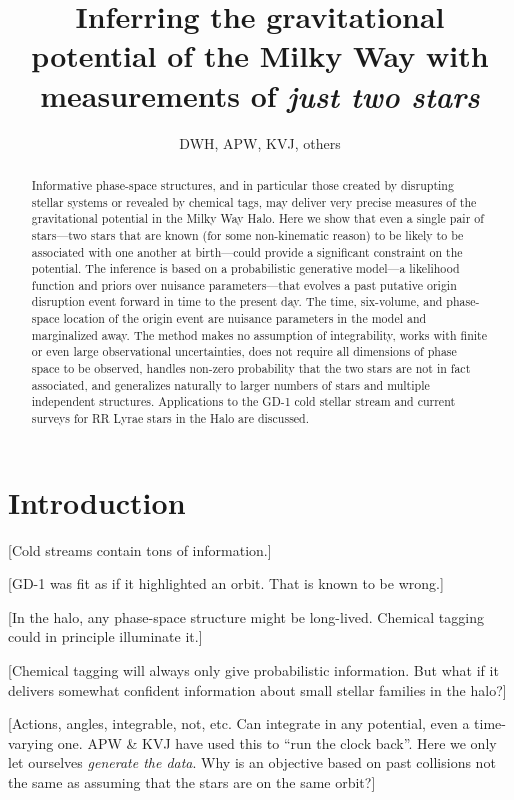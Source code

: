 \documentclass[letterpaper,12pt,preprint]{aastex}
\begin{document}
\title{Inferring the gravitational potential of the Milky Way with measurements of \emph{just two stars}}
\author{DWH, APW, KVJ, others}

\begin{abstract}
Informative phase-space structures, and in particular those created by
disrupting stellar systems or revealed by chemical tags, may deliver
very precise measures of the gravitational potential in the Milky Way
Halo.  Here we show that even a single pair of stars---two stars that
are known (for some non-kinematic reason) to be likely to be
associated with one another at birth---could provide a significant
constraint on the potential.  The inference is based on a
probabilistic generative model---a likelihood function and priors over
nuisance parameters---that evolves a past putative origin disruption
event forward in time to the present day.  The time, six-volume, and
phase-space location of the origin event are nuisance parameters in
the model and marginalized away.  The method makes no assumption of
integrability, works with finite or even large observational
uncertainties, does not require all dimensions of phase space to be
observed, handles non-zero probability that the two stars are not in
fact associated, and generalizes naturally to larger numbers of stars
and multiple independent structures.  Applications to the GD-1 cold
stellar stream and current surveys for RR Lyrae stars in the Halo are
discussed.
\end{abstract}


\section{Introduction}

[Cold streams contain tons of information.]

[GD-1 was fit as if it highlighted an orbit.  That is known to be
  wrong.]

[In the halo, any phase-space structure might be long-lived.  Chemical
  tagging could in principle illuminate it.]

[Chemical tagging will always only give probabilistic information.
  But what if it delivers somewhat confident information about small
  stellar families in the halo?]

[Actions, angles, integrable, not, etc.  Can integrate in any
  potential, even a time-varying one.  APW \& KVJ have used this to
  ``run the clock back''.  Here we only let ourselves \emph{generate
    the data}.  Why is an objective based on past collisions not the
  same as assuming that the stars are on the same orbit?]
\end{document}
